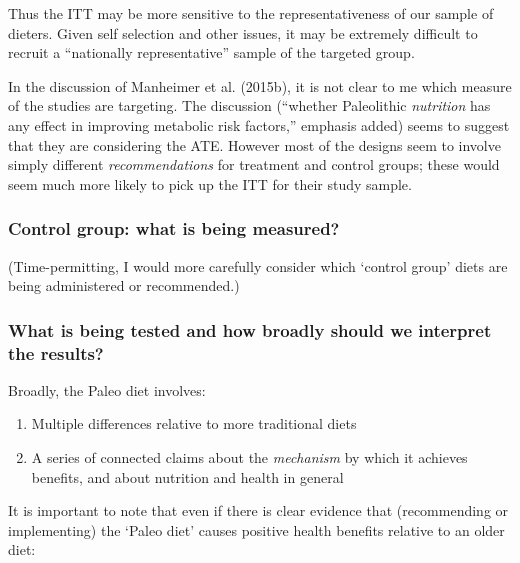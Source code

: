\documentclass[]{tufte-handout}
\begin{document}
Thus the ITT may be more sensitive to the representativeness of our
sample of dieters. Given self selection and other issues, it may be
extremely difficult to recruit a ``nationally representative'' sample of
the targeted group.

In the discussion of Manheimer et al. (2015b), it is not clear to me
which measure of the studies are targeting. The discussion (``whether
Paleolithic \emph{nutrition} has any effect in improving metabolic risk
factors,'' emphasis added) seems to suggest that they are considering
the ATE. However most of the designs seem to involve simply different
\emph{recommendations} for treatment and control groups; these would
seem much more likely to pick up the ITT for their study sample.

\hypertarget{control-group-what-is-being-measured}{%
\subsubsection{Control group: what is being
measured?}\label{control-group-what-is-being-measured}}

(Time-permitting, I would more carefully consider which `control group'
diets are being administered or recommended.)

\hfill\break

\hypertarget{what-is-being-tested-and-how-broadly-should-we-interpret-the-results}{%
\subsubsection{What is being tested and how broadly should we interpret
the
results?}\label{what-is-being-tested-and-how-broadly-should-we-interpret-the-results}}

Broadly, the Paleo diet involves:

\begin{enumerate}
\def\labelenumi{\arabic{enumi}.}
\item
  Multiple differences relative to more traditional diets
\item
  A series of connected claims about the \emph{mechanism} by which it
  achieves benefits, and about nutrition and health in general
\end{enumerate}

\hfill\break

It is important to note that even if there is clear evidence that
(recommending or implementing) the `Paleo diet' causes positive health
benefits relative to an older diet:
\end{document}

